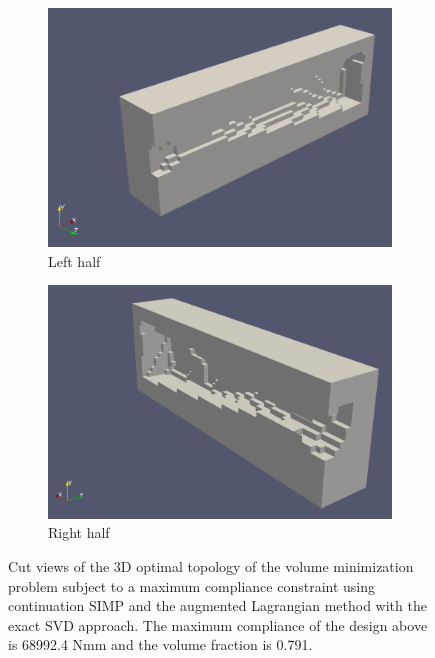       \begin{figure}
        \centering
        \begin{subfigure}[t]{0.45\textwidth}
          \centering
          \includegraphics[width=1\textwidth]{./images/robust_exact/exact_max_1.png}
          \caption{Left half}
        \end{subfigure}
        \begin{subfigure}[t]{0.45\textwidth}
          \centering
          \includegraphics[width=1\textwidth]{./images/robust_exact/exact_max_2.png}
          \caption{Right half}
        \end{subfigure}
        \caption{Cut views of the 3D optimal topology of the volume minimization problem subject to a maximum compliance constraint using continuation SIMP and the augmented Lagrangian method with the exact SVD approach. The maximum compliance of the design above is 68992.4 Nmm and the volume fraction is 0.791.}
        \label{fig:max_3d}
      \end{figure}

